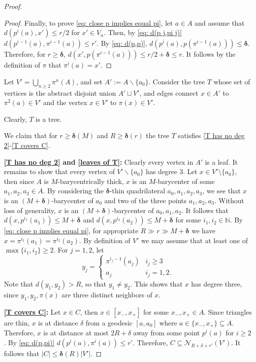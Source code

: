 \documentclass[10pt,a4paper]{amsart}
\newcommand{\bbN}{\mathbb{N}}
\newcommand{\bdelta}{{\boldsymbol\delta}}
\newcommand{\calN}{\mathcal{N}}
\newcommand{\ssm}{\smallsetminus}
\begin{document}
\begin{proof}
\begin{proof}
        Finally, to prove \eqref{eq: close p implies equal pi}, let $a\in A$ and assume that $d(p^i(a),x')\le r/2$ for $x'\in V_n$. Then, by \eqref{eq: d(p j,pi j)} $d(p^{i-1}(a),\pi ^{i-1}(a))\le r'$. By \eqref{eq: d(p,p)}, $d(p^i(a),p(\pi^{i-1}(a)))\le \bdelta$. Therefore, for $r\ge \bdelta$, $d(x',p(\pi^{i-1}(a)))\le r/2+\bdelta\le r$. 
        It follows by the definition of $\pi$ that $\pi^i(a)=x'$.
    \end{proof}

    Let $V' = \bigcup_{n\ge 2} \pi^n(A)$, and set $A' := A\ssm\{a_0\}$.
    Consider the tree $T$ whose set of vertices is the abstract disjoint union $A'\sqcup V'$, and edges connect $x \in A'$ to $\pi^2(a)\in V'$ and the vertex $x\in V'$ to $\pi(x)\in V'$.
    
    Clearly, $T$ is a tree.

    We claim that for $r\ge \bdelta(M)$ and $R\ge \bdelta(r)$ the tree $T$ satisfies \ref{T has no deg 2}-\ref{T covers C}.

\bigskip

    \noindent\textbf{\ref{T has no deg 2} and \ref{leaves of T}:}
    Clearly every vertex in $A'$ is a leaf. 
    It remains to show that every vertex of $V' \ssm \{a_0\}$ has degree 3.
    Let $x\in V'\setminus \{a_0\}$, then since $A$ is $M$-barycentrically thick, $x$ is an $M$-barycenter of some $a_1,a_2,a_3\in A$. 
    By considering the $\bdelta$-thin quadrilateral $a_0,a_1,a_2,a_3$, we see that $x$ is an $(M+\bdelta)$-barycenter of $a_0$ and two of the three points $a_1,a_2,a_3$. Without loss of generality, $x$ is an $(M+\bdelta)$-barycenter of $a_0,a_1,a_2$.
    It follows that $d(x,p^{i_1}(a_1))\le M+\bdelta$ and $d(x,p^{i_2}(a_2))\le M+\bdelta$ for some $i_1,i_2\in \bbN$.
    By \eqref{eq: close p implies equal pi}, for appropriate $R\gg r\gg M+\bdelta$ we have $x  = \pi^{i_1} (a_1)=\pi^{i_2}(a_2)$.
    By definition of $V'$ we may assume that at least one of $\max\{i_1,i_2\}\ge 2$.
    For $j=1,2$, let $$y_j = \begin{cases} \pi^{i_j-1}(a_j) & i_j\ge 3\\ a_j &i_j =1, 2. \end{cases}$$ 
    Note that $d(y_1,y_2)>R$, so that $y_1\ne y_2$. 
    This shows that $x$ has degree three, since $y_1,y_2,\pi(x)$ are three distinct neighbors of $x$.

    \bigskip

    \noindent \textbf{\ref{T covers C}:} 
    Let $x\in C$, then $x\in [x_-,x_+]$ for some $x_-,x_+\in A$. Since triangles are thin, $x$ is at distance $\delta$ from a geodesic $[a,a_0]$ where $a\in \{x_-,x_+\}\subseteq A$.
Therefore, $x$ is at distance at most $2R+\delta$ away from some point $p^i(a)$ for $i\ge 2$. By \eqref{eq: d(p,pi)} $d(p^i(a),\pi^i(a)) \le r'$. 
Therefore, $C \subseteq \calN_{R+\delta+r'}(V')$.
    It follows that $|C|\le \bdelta(R)|V'| $.
\end{proof}
\end{document}
